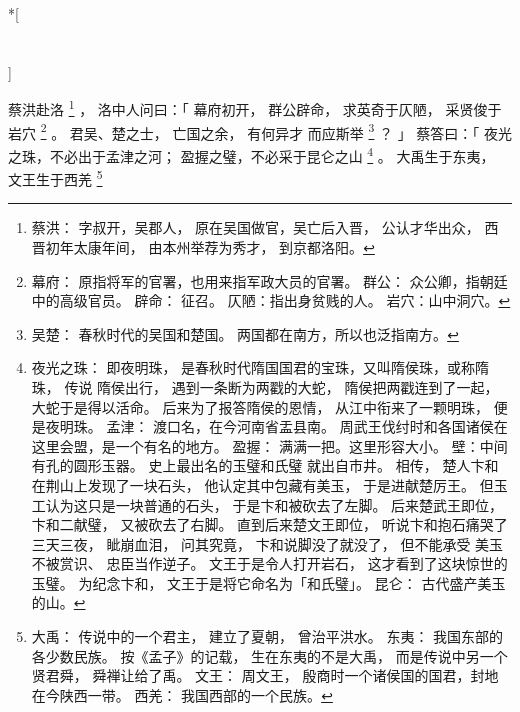 
\switchcolumn[0]*[\section{}]

蔡洪赴洛%
\footnote{%
    蔡洪：
        字叔开，吴郡人，
        原在吴国做官，吴亡后入晋，
        公认才华出众，
        西晋初年太康年间，
        由本州举荐为秀才，
        到京都洛阳。
}%
，
洛中人问曰：「
    幕府初开，
    群公辟命，
    求英奇于仄陋，
    采贤俊于岩穴%
    \footnote{%
        幕府：
            原指将军的官署，也用来指军政大员的官署。
        群公：
            众公卿，指朝廷中的高级官员。
        辟命：
            征召。
        仄陋：指出身贫贱的人。
        岩穴：山中洞穴。
    }%
    。
    君吴、楚之士，
    亡国之余，
    有何异才
    而应斯举%
    \footnote{%
        吴楚：
            春秋时代的吴国和楚国。
            两国都在南方，所以也泛指南方。
    }%
    ？
」
蔡答曰：「
    夜光之珠，不必出于孟津之河；
    盈握之璧，不必采于昆仑之山%
    \footnote{%
        夜光之珠：
            即夜明珠，
            是春秋时代隋国国君的宝珠，又叫隋侯珠，或称隋珠，
            传说
            隋侯出行，
            遇到一条断为两戳的大蛇，
            隋侯把两戳连到了一起，
            大蛇于是得以活命。
            后来为了报答隋侯的恩情，
            从江中衔来了一颗明珠，
            便是夜明珠。
        孟津：
            渡口名，在今河南省盂县南。
            周武王伐纣时和各国诸侯在这里会盟，是一个有名的地方。
        盈握：
            满满一把。这里形容大小。
        壁：中间有孔的圆形玉器。
            史上最出名的玉璧和氏璧
            就出自市井。
            相传，
            楚人卞和在荆山上发现了一块石头，
            他认定其中包藏有美玉，
            于是进献楚厉王。
            但玉工认为这只是一块普通的石头，
            于是卞和被砍去了左脚。
            后来楚武王即位，
            卞和二献璧，
            又被砍去了右脚。
            直到后来楚文王即位，
            听说卞和抱石痛哭了三天三夜，
            眦崩血泪，
            问其究竟，
            卞和说脚没了就没了，
            但不能承受
            美玉不被赏识、
            忠臣当作逆子。
            文王于是令人打开岩石，
            这才看到了这块惊世的玉璧。
            为纪念卞和，
            文王于是将它命名为「和氏璧」。
        昆仑：
            古代盛产美玉的山。
    }%
    。
    大禹生于东夷，
    文王生于西羌%
    \footnote{%
        大禹：
            传说中的一个君主，
            建立了夏朝，
            曾治平洪水。
        东夷：
            我国东部的各少数民族。
            按《孟子》的记载，
            生在东夷的不是大禹，
            而是传说中另一个贤君舜，
            舜禅让给了禹。
        文王：
            周文王，
            殷商时一个诸侯国的国君，封地在今陕西一带。
        西羌：
            我国西部的一个民族。
    }%
